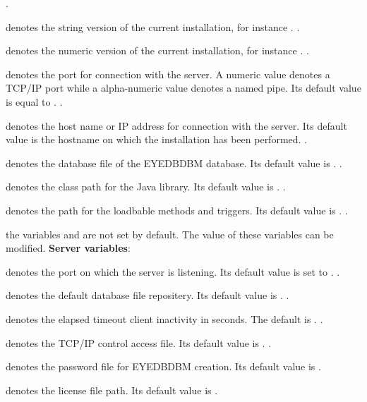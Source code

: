 \constvar.
\item {} denotes the string version of the current \eyedb
installation, for instance \ttv{\eyedbversion}. \constvar.
\item {} denotes the numeric version of the current \eyedb
installation, for instance . \constvar.
\item {} denotes the port for connection
with the \eyedb server. A numeric value denotes a TCP/IP port while
a alpha-numeric value denotes a named pipe. Its default value is
equal to . \modvar.
\item {} denotes the host name or IP address for connection with
the \eyedb server. Its default value is the hostname on which the
installation has been performed. \modvar.
\item {} denotes the database file of the EYEDBDBM database. Its
default value is .
\modvar.
\item {} denotes the class path for the \eyedb Java library.
Its default value is .
\modvar.
\item {} denotes the path for the loadbable methods and triggers.
Its default value is .
\modvar.
\item the variables  and  are not set by default.
The value of these variables can be modified.
\ei
{\bf Server variables}:
\bi
\item {} denotes the port on which the \eyedb server is listening.
Its default value is set to . \modvar.
\item {} denotes the default database file repositery.
Its default value is . \modvar.
\item {} denotes the elapsed timeout client inactivity in
seconds. The default is . \modvar.
\item {} denotes the TCP/IP control access file.
Its default value is .
\modvar.
\item {} denotes the password file for
EYEDBDBM creation. Its default value is .
\item {} denotes the license file path.
Its default value is .
\ei
